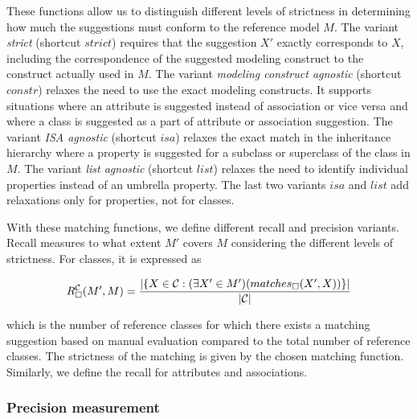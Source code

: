 These functions allow us to distinguish different levels of strictness in determining how much the suggestions must conform to the reference model $M$.
The variant \emph{strict} (shortcut $strict$) requires that the suggestion $X'$ exactly corresponds to $X$, including the correspondence of the suggested modeling construct to the construct actually used in $M$.
The variant \emph{modeling construct agnostic} (shortcut $constr$) relaxes the need to use the exact modeling constructs.
It supports situations where an attribute is suggested instead of association or vice versa and where a class is suggested as a part of attribute or association suggestion.
The variant \emph{ISA agnostic} (shortcut $isa$) relaxes the exact match in the inheritance hierarchy where a property is suggested for a subclass or superclass of the class in $M$.
The variant \emph{list agnostic} (shortcut $list$) relaxes the need to identify individual properties instead of an umbrella property.
The last two variants $isa$ and $list$ add relaxations only for properties, not for classes.

With these matching functions, we define different recall and precision variants.
Recall measures to what extent $M'$ covers $M$ considering the different levels of strictness.
For classes, it is expressed as


\[R^{\cal C}_\Box(M',M) = \frac{\vert \{X \in {\cal C}: (\exists X' \in M')(matches_\Box(X',X))\} \vert}{\vert {\cal C} \vert}\]

\noindent which is the number of reference classes for which there exists a matching suggestion based on manual evaluation compared to the total number of reference classes.
The strictness of the matching is given by the chosen matching function.
Similarly, we define the recall for attributes and associations.


\subsubsection{Precision measurement}


